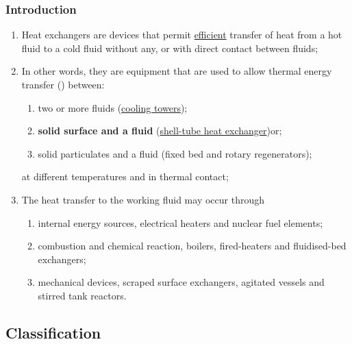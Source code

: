 \documentclass[10pt,compress,unknownkeysallowed]{beamer}
\begin{document}
\begin{frame}
 \frametitle{Introduction}
    \begin{enumerate}%
        \item<1-> Heat exchangers are devices that permit \underline{efficient} transfer of heat from a hot fluid to a cold fluid without any, or with direct contact between fluids;
        \item<2-> In other words, they are equipment that are used to allow thermal energy transfer (\ie {}) between:
            \begin{enumerate}%
               \item<2-> two or more fluids (\eg \href{https://www.youtube.com/watch?v=QfLCjj73MZA}{cooling towers});
               \item<2-> {\bf solid surface and a fluid} (\eg \href{https://www.youtube.com/watch?v=pKRn-rv61Ss&t=103s}{shell-tube heat exchanger})or;
               \item<2-> solid particulates and a fluid (\eg fixed bed and rotary regenerators);
            \end{enumerate}
            at different temperatures and in thermal contact;
       \item<3-> The heat transfer to the working fluid may occur through
            \begin{enumerate}%
               \item<3-> internal energy sources, \eg electrical heaters and nuclear fuel elements;
               \item<3-> combustion and chemical reaction, \eg boilers, fired-heaters and fluidised-bed exchangers;
               \item<3-> mechanical devices, \eg scraped surface exchangers, agitated vessels and stirred tank reactors.
            \end{enumerate}
   \end{enumerate}
\end{frame}


\subsection{Classification}
\end{document}
